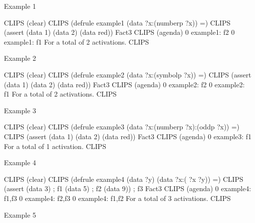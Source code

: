 \documentclass[letterpaper,10pt,english]{sphinxmanual}
\begin{document}
Example 1

\begin{sphinxVerbatim}[commandchars=\\\{\}]
CLIPS\PYGZgt{} (clear)
CLIPS\PYGZgt{}
(defrule example\PYGZhy{}1
  (data ?x\PYGZam{}:(numberp ?x))
  =\PYGZgt{})
CLIPS\PYGZgt{} (assert (data 1) (data 2) (data red))
\PYGZlt{}Fact\PYGZhy{}3\PYGZgt{}
CLIPS\PYGZgt{} (agenda)
0 example\PYGZhy{}1: f\PYGZhy{}2
0 example\PYGZhy{}1: f\PYGZhy{}1
For a total of 2 activations.
CLIPS\PYGZgt{}
\end{sphinxVerbatim}

Example 2

\begin{sphinxVerbatim}[commandchars=\\\{\}]
CLIPS\PYGZgt{} (clear)
CLIPS\PYGZgt{}
(defrule example\PYGZhy{}2
  (data ?x\PYGZam{}\PYGZti{}:(symbolp ?x))
  =\PYGZgt{})
CLIPS\PYGZgt{} (assert (data 1) (data 2) (data red))
\PYGZlt{}Fact\PYGZhy{}3\PYGZgt{}
CLIPS\PYGZgt{} (agenda)
0 example\PYGZhy{}2: f\PYGZhy{}2
0 example\PYGZhy{}2: f\PYGZhy{}1
For a total of 2 activations.
CLIPS\PYGZgt{}
\end{sphinxVerbatim}

Example 3

\begin{sphinxVerbatim}[commandchars=\\\{\}]
CLIPS\PYGZgt{} (clear)
CLIPS\PYGZgt{}
(defrule example\PYGZhy{}3
  (data ?x\PYGZam{}:(numberp ?x)\PYGZam{}:(oddp ?x))
  =\PYGZgt{})
CLIPS\PYGZgt{} (assert (data 1) (data 2) (data red))
\PYGZlt{}Fact\PYGZhy{}3\PYGZgt{}
CLIPS\PYGZgt{} (agenda)
0 example\PYGZhy{}3: f\PYGZhy{}1
For a total of 1 activation.
CLIPS\PYGZgt{}
\end{sphinxVerbatim}

Example 4

\begin{sphinxVerbatim}[commandchars=\\\{\}]
CLIPS\PYGZgt{} (clear)
CLIPS\PYGZgt{}
(defrule example\PYGZhy{}4
  (data ?y)
  (data ?x\PYGZam{}:(\PYGZgt{} ?x ?y))
  =\PYGZgt{})
CLIPS\PYGZgt{} (assert (data 3) ; f\PYGZhy{}1
(data 5) ; f\PYGZhy{}2
(data 9)) ; f\PYGZhy{}3
\PYGZlt{}Fact\PYGZhy{}3\PYGZgt{}
CLIPS\PYGZgt{} (agenda)
0 example\PYGZhy{}4: f\PYGZhy{}1,f\PYGZhy{}3
0 example\PYGZhy{}4: f\PYGZhy{}2,f\PYGZhy{}3
0 example\PYGZhy{}4: f\PYGZhy{}1,f\PYGZhy{}2
For a total of 3 activations.
CLIPS\PYGZgt{}
\end{sphinxVerbatim}

Example 5
\end{document}
